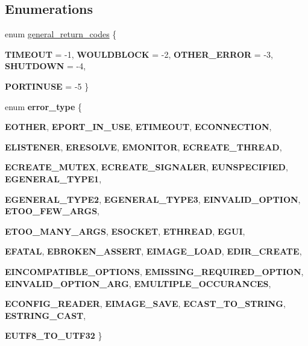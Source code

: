 \subsection*{Enumerations}
\begin{DoxyCompactItemize}
\item 
enum \hyperlink{namespacedlib_a3d0eb509fdefecd0e9f75bab1a0c97d9}{general\_\-return\_\-codes} \{ \par
{\bfseries TIMEOUT} =  -\/1, 
{\bfseries WOULDBLOCK} =  -\/2, 
{\bfseries OTHER\_\-ERROR} =  -\/3, 
{\bfseries SHUTDOWN} =  -\/4, 
\par
{\bfseries PORTINUSE} =  -\/5
 \}
\item 
enum {\bfseries error\_\-type} \{ \par
{\bfseries EOTHER}, 
{\bfseries EPORT\_\-IN\_\-USE}, 
{\bfseries ETIMEOUT}, 
{\bfseries ECONNECTION}, 
\par
{\bfseries ELISTENER}, 
{\bfseries ERESOLVE}, 
{\bfseries EMONITOR}, 
{\bfseries ECREATE\_\-THREAD}, 
\par
{\bfseries ECREATE\_\-MUTEX}, 
{\bfseries ECREATE\_\-SIGNALER}, 
{\bfseries EUNSPECIFIED}, 
{\bfseries EGENERAL\_\-TYPE1}, 
\par
{\bfseries EGENERAL\_\-TYPE2}, 
{\bfseries EGENERAL\_\-TYPE3}, 
{\bfseries EINVALID\_\-OPTION}, 
{\bfseries ETOO\_\-FEW\_\-ARGS}, 
\par
{\bfseries ETOO\_\-MANY\_\-ARGS}, 
{\bfseries ESOCKET}, 
{\bfseries ETHREAD}, 
{\bfseries EGUI}, 
\par
{\bfseries EFATAL}, 
{\bfseries EBROKEN\_\-ASSERT}, 
{\bfseries EIMAGE\_\-LOAD}, 
{\bfseries EDIR\_\-CREATE}, 
\par
{\bfseries EINCOMPATIBLE\_\-OPTIONS}, 
{\bfseries EMISSING\_\-REQUIRED\_\-OPTION}, 
{\bfseries EINVALID\_\-OPTION\_\-ARG}, 
{\bfseries EMULTIPLE\_\-OCCURANCES}, 
\par
{\bfseries ECONFIG\_\-READER}, 
{\bfseries EIMAGE\_\-SAVE}, 
{\bfseries ECAST\_\-TO\_\-STRING}, 
{\bfseries ESTRING\_\-CAST}, 
\par
{\bfseries EUTF8\_\-TO\_\-UTF32}
 \}
\end{DoxyCompactItemize}
